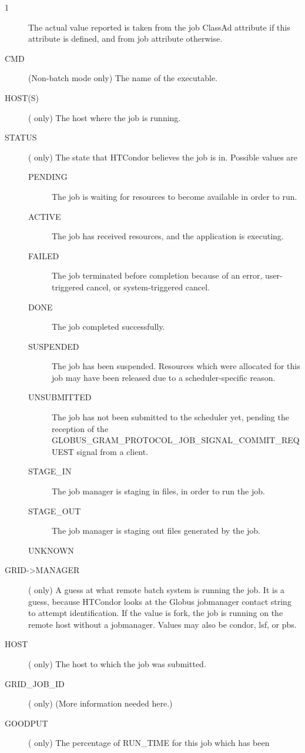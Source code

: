 \begin{ManPage}{\label{man-condor-q}}{1}
\begin{description}
	The actual value reported is taken from the job ClassAd attribute
	 if this attribute is defined, and from job
	attribute  otherwise.
\item[CMD] (Non-batch mode only) The name of the executable. 
\item[HOST(S)] ( only) The host where the job is running.
\item[STATUS] ( only) The state that HTCondor believes the job is in.
Possible values are
  \begin{description}
    \item[PENDING] The job is waiting for resources to become available
    in order to run.
    \item[ACTIVE] The job has received resources, and the application
    is executing.
    \item[FAILED] The job terminated before completion because of an error,
    user-triggered cancel, or system-triggered cancel.
    \item[DONE] The job completed successfully.
    \item[SUSPENDED] The job has been suspended.
    Resources which were allocated for this job may have been
    released due to a scheduler-specific reason.
    \item[UNSUBMITTED] The job has not been submitted to the scheduler yet,
    pending the reception of the 
    GLOBUS\_GRAM\_PROTOCOL\_JOB\_SIGNAL\_COMMIT\_REQUEST signal from a client.
    \item[STAGE\_IN] The job manager is staging in files,
    in order to run the job.
    \item[STAGE\_OUT] The job manager is staging out files
    generated by the job.
    \item[UNKNOWN]
  \end{description}
\item[GRID->MANAGER] 
  ( only) A guess at what remote batch system is running the job.
  It is a guess, because HTCondor looks at the Globus jobmanager contact
  string to attempt identification.
  If the value is fork, the job is running on the
  remote host without a jobmanager.
  Values may also be condor, lsf, or pbs.
\item[HOST] ( only) The host to which the job was submitted.
\item[GRID\_JOB\_ID] ( only) (More information needed here.)
\item[GOODPUT] ( only) The percentage of RUN\_TIME for this job which has been

\end{description}
\end{ManPage}
